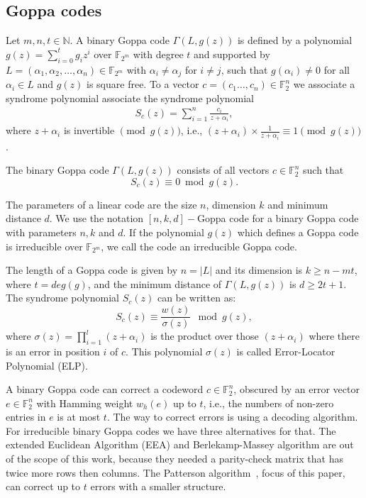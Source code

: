 \subsection{Goppa codes}
Let $m, n, t\in \mathbb{N}$. A binary Goppa code $\Gamma(L, g(z))$ is defined by a polynomial $g(z) = \sum_{i=0}^{t}g_iz^i$ over $\mathbb{F}_{2^m}$ with degree $t$ and supported by $L = (\alpha_1, \alpha_2, \dots, \alpha_n) \in \mathbb{F}_{2^m}$ with $\alpha_i \neq \alpha_j$ for $i\neq j$, such that $g(\alpha_i) \neq 0$ for all $\alpha_i \in L$ and $g(z)$ is square free. To a vector  $c = (c_1 \ldots, c_{n}) \in \mathbb{F}^n_{2}$ we associate a syndrome polynomial associate the syndrome polynomial
\begin{align}
  S_c(z) = \sum_{i=1}^{n} \frac{c_i}{z+\alpha_i},  
\end{align}
where ${z+\alpha_i}$ is invertible $\pmod{g(z)}$, i.e., $(z+\alpha_i) \times \frac{1}{z+\alpha_i} \equiv 1 \pmod{g(z)}$.
\begin{definition}
The binary Goppa code $\Gamma(L, g(z))$ consists of all vectors $c \in \mathbb{F}_{2}^n$ such that
\begin{equation}
    S_c(z) \equiv 0 \bmod{g(z)}.
\end{equation}
\end{definition}

The parameters of a linear code are the size $n$, dimension $k$ and minimum distance $d$. We use the notation $[n,k,d]-$Goppa code for a binary Goppa code with parameters $n,k$ and $d$. If the polynomial $g(z)$ which defines a Goppa code is irreducible over $\mathbb{F}_{2^m}$, we call the code an irreducible Goppa code.

The length of a Goppa code is given by $n = |L|$ and its dimension is $k \geq n-mt$, where $t = deg(g)$, and the minimum distance of $\Gamma(L, g(z))$ is $d \geq 2t + 1$. The syndrome polynomial $S_c(z)$ can be written as:
\begin{equation}
    S_c(z) \equiv \frac{w(z)}{\sigma(z)} \mod g(z),
\end{equation}
where $\sigma(z) = {\displaystyle \prod_{i=1}^{l}(z+\alpha_i)}$ is the product over those $(z+\alpha_i)$ where there is an error in position $i$ of $c$. This polynomial $\sigma(z)$ is called Error-Locator Polynomial (ELP).

A binary Goppa code can correct a codeword $c \in \mathbb{F}_{2}^n$, obscured by an error vector $e \in \mathbb{F}_{2}^n$ with Hamming weight $w_h(e)$ up to $t$, i.e., the numbers of non-zero entries in $e$ is at most $t$. The way to correct errors is using a decoding algorithm. For irreducible binary Goppa codes we have three alternatives for that. The extended Euclidean Algorithm (EEA) and Berlekamp-Massey algorithm are out of the scope of this work, because they needed a parity-check matrix that has twice more rows then columns. The Patterson algorithm~\cite{patterson1975algebraic}, focus of this paper, can correct up to $t$ errors with a smaller structure.

